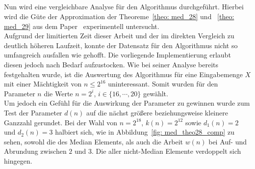 \subsection{\RM}		%

\noindent
Nun wird eine vergleichbare Analyse für den Algorithmus \RM durchgeführt. Hierbei wird die Güte der Approximation der Theoreme~\ref{theo: med_28} und ~\ref{theo: med_29} aus dem Paper~\cite[S.24]{meyer2} experimentell untersucht.\\[.1cm]
Aufgrund der limitierten Zeit dieser Arbeit und der im direkten Vergleich zu \Rm deutlich höheren Laufzeit, konnte der Datensatz für den Algorithmus \RM nicht so umfangreich ausfallen wie gehofft. Die vorliegende Implementierung erlaubt diesen jedoch nach Bedarf aufzustocken. Wie bei seiner Analyse bereits festgehalten wurde, ist die Auswertung des Algorithmus \RM für eine Eingabemenge $X$ mit einer Mächtigkeit von $n \leq 2^{16}$ uninteressant. Somit wurden für den Parameter $n$ die Werte $n =2^i$, $i\in\{16,\cdots,20\}$ gewählt.\\[.05cm]
Um jedoch ein Gefühl für die Auswirkung der Parameter zu gewinnen wurde zum Test der Parameter $d(n)$ auf die nächst größere beziehungsweise kleinere Ganzzahl gerundet. Bei der Wahl von $n=2^{18}$, $k(n)=2^{12}$ sowie $d_1(n)=2$ und $d_2(n)=3$ halbiert sich, wie in Abbildung~\ref{fig: med_theo28_comp} zu sehen, sowohl die \fg des Median Elements, als auch die Arbeit $w(n)$ bei Auf- und Abrundung zwischen $2$ und $3$. Die \fg aller nicht-Median Elemente \fgr verdoppelt sich hingegen.

